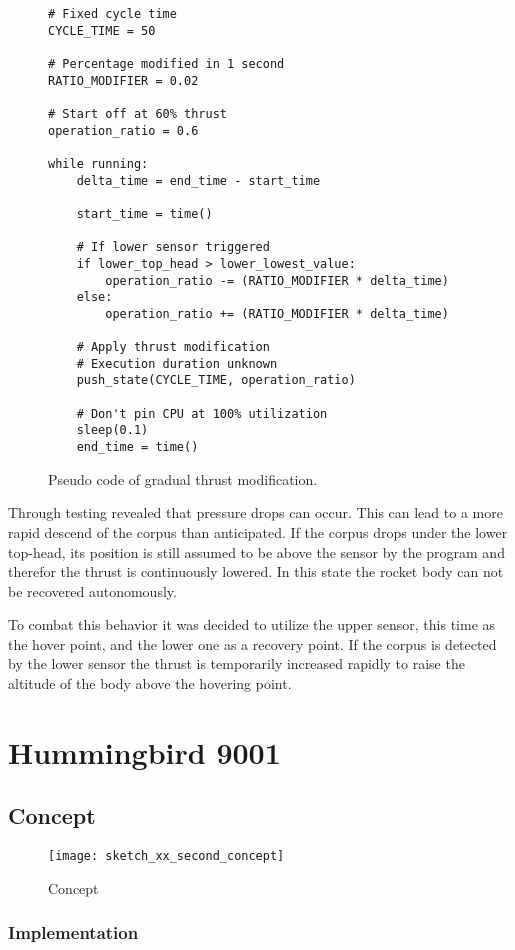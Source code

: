 \begin{figure}[h]
\begin{verbatim}
# Fixed cycle time
CYCLE_TIME = 50

# Percentage modified in 1 second
RATIO_MODIFIER = 0.02

# Start off at 60% thrust
operation_ratio = 0.6

while running:
    delta_time = end_time - start_time
    
    start_time = time()

    # If lower sensor triggered
    if lower_top_head > lower_lowest_value:
        operation_ratio -= (RATIO_MODIFIER * delta_time)
    else:
        operation_ratio += (RATIO_MODIFIER * delta_time)

    # Apply thrust modification
    # Execution duration unknown
    push_state(CYCLE_TIME, operation_ratio)

    # Don't pin CPU at 100% utilization
    sleep(0.1)
    end_time = time()
\end{verbatim}
\caption{Pseudo code of gradual thrust modification.}
\end{figure}

Through testing revealed that pressure drops can occur. This can lead to a more rapid descend of the corpus than anticipated. If the corpus drops under the lower top-head, its position is still assumed to be above the sensor by the program and therefor the thrust is continuously lowered. In this state the rocket body can not be recovered autonomously. 

To combat this behavior it was decided to utilize the upper sensor, this time as the hover point, and the lower one as a recovery point. If the corpus is detected by the lower sensor the thrust is temporarily increased rapidly to raise the altitude of the body above the hovering point. 



\chapter{Hummingbird 9001}

\section{Concept}



\begin{figure}[h]
\centering

\texttt{[image: sketch\_xx\_second\_concept]}

\caption{Concept}
\end{figure}

\subsection{Implementation}

